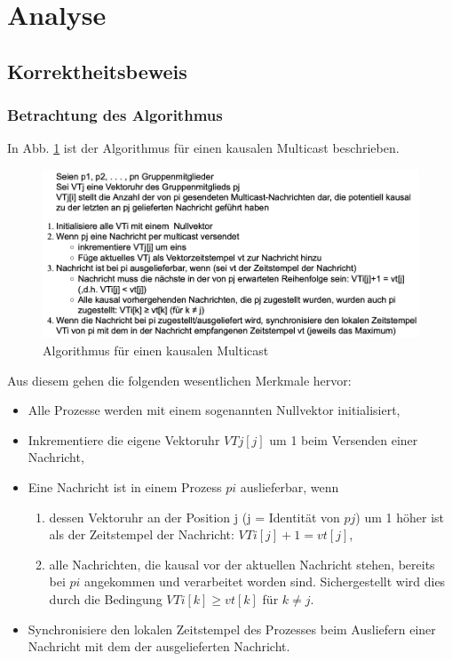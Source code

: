\section{Analyse}

\subsection{Korrektheitsbeweis}

\subsubsection{Betrachtung des Algorithmus} \label{algo_analyse}

In Abb. \ref{definition_kausal} ist der Algorithmus für einen kausalen Multicast beschrieben.

\begin{figure}[htbp]
\begin{center}
\includegraphics[scale=0.4]{Latex/Bilder/Definition.png}
\caption{\label{definition_kausal} Algorithmus für einen kausalen Multicast \cite{Aufgabenstellung}}
\end{center}
\end{figure}

Aus diesem gehen die folgenden wesentlichen Merkmale hervor:

\begin{itemize}
    \item Alle Prozesse werden mit einem sogenannten Nullvektor initialisiert,
    \item Inkrementiere die eigene Vektoruhr $VTj[j]$ um 1 beim Versenden einer Nachricht,
    \item Eine Nachricht ist in einem Prozess $pi$ auslieferbar, wenn
        \begin{enumerate}
            \item dessen Vektoruhr an der Position j (j = Identität von $pj$) um 1 höher ist als der Zeitstempel der Nachricht: $VTi[j]+1 = vt[j]$,
            \item alle Nachrichten, die kausal vor der aktuellen Nachricht stehen, bereits bei $pi$ angekommen und verarbeitet worden sind. Sichergestellt wird dies durch die Bedingung $VTi[k]\geq vt[k]$ für $k \neq j$.
        \end{enumerate}
    \item Synchronisiere den lokalen Zeitstempel des Prozesses beim Ausliefern einer Nachricht mit dem der ausgelieferten Nachricht.
\end{itemize}

